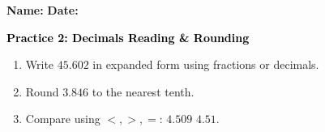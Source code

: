 \documentclass[12pt, letterpaper, fleqn]{article}
\newcommand{\blank}{\underline{\hspace{2.2cm}}}
\begin{document}
\textbf{Name:} \underline{\hspace{5cm}}
\hfill
\textbf{Date:} \underline{\hspace{3cm}}\\

\begin{tcolorbox}[colback=customteal!20]
    \large\textcolor{black}{\textbf{Practice 2: Decimals Reading \& Rounding}}
\end{tcolorbox}
\begin{enumerate}[itemsep=3.5cm, leftmargin=0.6cm]
\item Write $45.602$ in expanded form using fractions or decimals.
\vspace{3.5cm}
\item Round $3.846$ to the nearest tenth.
\vspace{3.5cm}
\item Compare using $<, >, =$: $4.509$ \blank $4.51$.
\end{enumerate}
\end{document}

